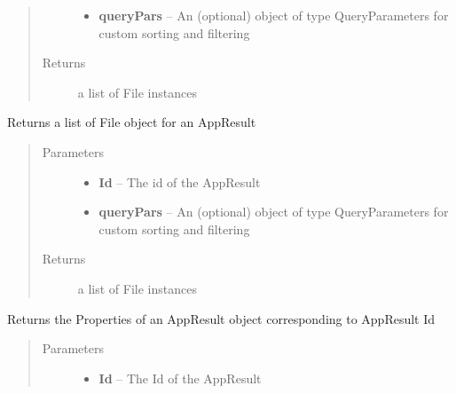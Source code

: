 \documentclass[letterpaper,10pt,english]{sphinxmanual}
\begin{document}
\begin{fulllineitems}
\begin{fulllineitems}
\begin{quote}
\begin{description}
\begin{itemize}
\item {} 
\textbf{queryPars} -- An (optional) object of type QueryParameters for custom sorting and filtering

\end{itemize}

\item[{Returns}] \leavevmode
a list of File instances

\end{description}\end{quote}

\end{fulllineitems}


\begin{fulllineitems}
\label{Available modules:BaseSpacePy.api.BaseSpaceAPI.BaseSpaceAPI.getAppResultFilesById}
Returns a list of File object for an AppResult
\begin{quote}\begin{description}
\item[{Parameters}] \leavevmode\begin{itemize}
\item {} 
\textbf{Id} -- The id of the AppResult

\item {} 
\textbf{queryPars} -- An (optional) object of type QueryParameters for custom sorting and filtering

\end{itemize}

\item[{Returns}] \leavevmode
a list of File instances

\end{description}\end{quote}

\end{fulllineitems}


\begin{fulllineitems}
\label{Available modules:BaseSpacePy.api.BaseSpaceAPI.BaseSpaceAPI.getAppResultPropertiesById}
Returns the Properties of an AppResult object corresponding to AppResult Id
\begin{quote}\begin{description}
\item[{Parameters}] \leavevmode\begin{itemize}
\item {} 
\textbf{Id} -- The Id of the AppResult


\end{itemize}
\end{description}
\end{quote}
\end{fulllineitems}
\end{fulllineitems}
\end{document}
